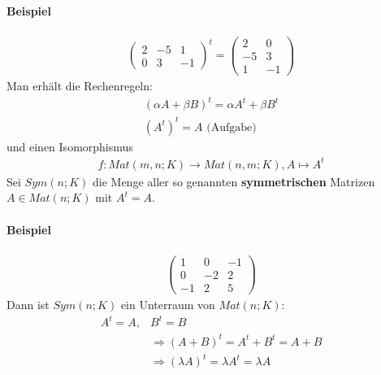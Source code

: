 \documentclass[11pt]{report}
\newcommand*\f[1] {\textbf{#1}}
\begin{document}
\paragraph{Beispiel}
\begin{align}
 \begin{pmatrix}
  2 & -5 & 1 \\ 0 & 3 & -1
 \end{pmatrix}^t = 
 \begin{pmatrix}
  2 & 0 \\ -5 & 3 \\ 1 & -1
 \end{pmatrix}
\end{align}
Man erhält die Rechenregeln:
\begin{align}
 (\alpha A + \beta B)^t =  \alpha A^t + \beta B^t \\
(A^t)^t = A \text{ (Aufgabe)}
\end{align}
und einen Isomorphismus
\begin{align}
 f: Mat(m,n;K) \rightarrow Mat(n,m;K), A \mapsto A^t
\end{align}
Sei $Sym(n;K)$ die Menge aller so genannten \f{symmetrischen} Matrizen $A \in Mat(n;K)$ mit $A^t = A$.

\paragraph{Beispiel}
\begin{align}
 \begin{pmatrix}
  1 & 0 & -1 \\ 0 & -2 & 2 \\ -1 & 2 & 5
 \end{pmatrix}
\end{align}
Dann ist $Sym(n;K)$ ein Unterraum von $Mat(n;K)$:
\begin{align}
 A^t = A, &B^t = B \\
&\Rightarrow (A+B)^t = A^t + B^t = A+B \\
&\Rightarrow (\lambda A)^t = \lambda A^t = \lambda A
\end{align}
\end{document}

